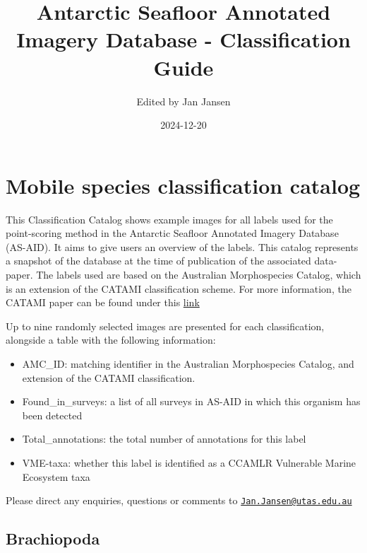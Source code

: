 \documentclass[
]{book}
\title{Antarctic Seafloor Annotated Imagery Database - Classification Guide}
\author{Edited by Jan Jansen}
\date{2024-12-20}
\providecommand{\tightlist}{%
  \setlength{\itemsep}{0pt}\setlength{\parskip}{0pt}}
\begin{document}
\maketitle

{
\setcounter{tocdepth}{1}
\tableofcontents
}
\hypertarget{mobile-species-classification-catalog}{%
\chapter*{Mobile species classification catalog}\label{mobile-species-classification-catalog}}

This Classification Catalog shows example images for all labels used for the point-scoring method in the Antarctic Seafloor Annotated Imagery Database (AS-AID). It aims to give users an overview of the labels. This catalog represents a snapshot of the database at the time of publication of the associated data-paper.
The labels used are based on the Australian Morphospecies Catalog, which is an extension of the CATAMI classification scheme. For more information, the CATAMI paper can be found under this \href{https://journals.plos.org/plosone/article?id=10.1371/journal.pone.0141039}{link}

Up to nine randomly selected images are presented for each classification, alongside a table with the following information:

\begin{itemize}
\tightlist
\item
  AMC\_ID: matching identifier in the Australian Morphospecies Catalog, and extension of the CATAMI classification.\\
\item
  Found\_in\_surveys: a list of all surveys in AS-AID in which this organism has been detected\\
\item
  Total\_annotations: the total number of annotations for this label\\
\item
  VME-taxa: whether this label is identified as a CCAMLR Vulnerable Marine Ecosystem taxa
\end{itemize}

Please direct any enquiries, questions or comments to \href{mailto:Jan.Jansen@utas.edu.au}{\nolinkurl{Jan.Jansen@utas.edu.au}}

\newpage

\hypertarget{brachiopoda}{%
\section{Brachiopoda}\label{brachiopoda}}
\end{document}
